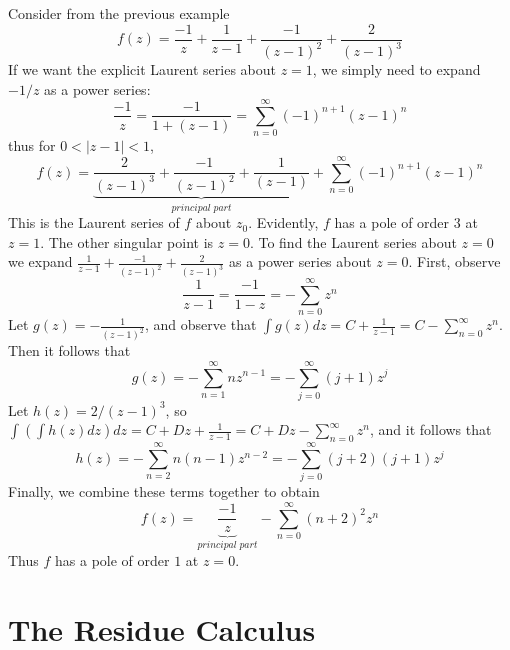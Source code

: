 \documentclass[12pt, a4paper, oneside, openright, titlepage]{book}
\begin{document}
\begin{eg}
    Consider from the previous example \begin{equation*}
        f(z) = \frac{-1}{z}+\frac{1}{z-1}+\frac{-1}{(z-1)^2}+\frac{2}{(z-1)^3}
    \end{equation*}
    If we want the explicit Laurent series about $z=1$, we simply need to expand $-1/z$ as a power series: \begin{equation*}
        \frac{-1}{z} = \frac{-1}{1+(z-1)} = \sum_{n=0}^{\infty}(-1)^{n+1}(z-1)^n
    \end{equation*}
    thus for $0 < |z-1| < 1$, \begin{equation*}
        f(z) = \underbrace{\frac{2}{(z-1)^3}+\frac{-1}{(z-1)^2}+\frac{1}{(z-1)}}_{principal\;part} + \sum_{n=0}^{\infty}(-1)^{n+1}(z-1)^n
    \end{equation*}
    This is the Laurent series of $f$ about $z_0$. Evidently, $f$ has a pole of order $3$ at $z = 1$. The other singular point is $z = 0$. To find the Laurent series about $z = 0$ we expand $\frac{1}{z-1}+\frac{-1}{(z-1)^2}+\frac{2}{(z-1)^3}$ as a power series about $z = 0$. First, observe \begin{equation*}
        \frac{1}{z-1} = \frac{-1}{1-z} = -\sum_{n=0}^{\infty}z^n
    \end{equation*}
    Let $g(z) = -\frac{1}{(z-1)^2}$, and observe that $\int g(z)dz = C + \frac{1}{z-1} = C - \sum_{n=0}^{\infty}z^n$. Then it follows that \begin{equation*}
        g(z) = -\sum_{n=1}^{\infty}nz^{n-1} = -\sum_{j=0}^{\infty}(j+1)z^j
    \end{equation*}
    Let $h(z) = 2/(z-1)^3$, so $\int(\int h(z)dz)dz = C+Dz+\frac{1}{z-1} = C+Dz - \sum_{n=0}^{\infty}z^n$, and it follows that \begin{equation*}
        h(z) = -\sum_{n=2}^{\infty}n(n-1)z^{n-2} = -\sum_{j=0}^{\infty}(j+2)(j+1)z^j
    \end{equation*}
    Finally, we combine these terms together to obtain \begin{equation*}
        f(z) = \underbrace{\frac{-1}{z}}_{principal\;part} -\sum_{n=0}^{\infty}(n+2)^2z^n
    \end{equation*}
    Thus $f$ has a pole of order $1$ at $z = 0$.
\end{eg}







\chapter{The Residue Calculus}
\end{document}

